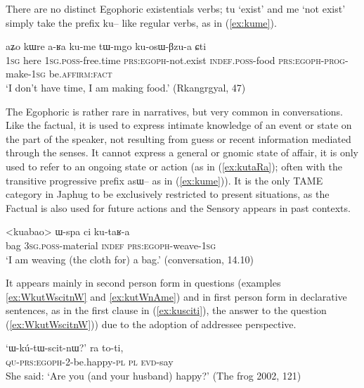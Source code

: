\documentclass[oldfontcommands,oneside,a4paper,11pt]{article}
\newcommand{\ipa}[1]{{\phon \mbox{#1}}} %
\newcommand{\refb}[1]{(\ref{#1})}
\newcommand{\factual}[1]{\textsc{:fact}}
\begin{document}
There are no distinct Egophoric existentials verbs; \ipa{tu} `exist' and \ipa{me}  `not exist' simply take the prefix \ipa{ku--} like regular verbs, as in \refb{ex:kume}.

\begin{exe}
\ex \label{ex:kume}
\gll 
\ipa{aʑo}  	\ipa{kɯre}  	\ipa{a-ʁa}  	\ipa{ku-me}  \ipa{tɯ-mgo} 	\ipa{ku-osɯ-βzu-a} 	\ipa{ɕti} 	  	\\
\textsc{1sg} here \textsc{1sg.poss}-free.time \textsc{prs:egoph}-not.exist \textsc{indef.poss}-food \textsc{prs:egoph}-\textsc{prog}-make-\textsc{1sg} be.\textsc{affirm}\factual{}  \\
\glt `I don't have time, I am making food.'  (Rkangrgyal, 47)
\end{exe}

The Egophoric  is rather rare in narratives, but very common in conversations. Like the factual, it is used to express intimate knowledge of an event or state on the part of the speaker, not resulting from guess or recent information mediated through the senses. It cannot express a general or gnomic state of affair, it is only used to refer to an ongoing state or action (as in \refb{ex:kutaRa}; often with the transitive progressive prefix \ipa{asɯ--} as in \refb{ex:kume}). It is the only TAME category in Japhug to be exclusively restricted to present situations, as the Factual is also used for future actions and the Sensory appears in past contexts.

\begin{exe}
\ex \label{ex:kutaRa}
\gll 
<kuabao> 	\ipa{ɯ-spa}  	\ipa{ci}  	\ipa{ku-taʁ-a}  \\
bag \textsc{3sg.poss}-material \textsc{indef} \textsc{prs:egoph}-weave-\textsc{1sg} \\
\glt `I am weaving (the cloth for) a bag.' (conversation, 14.10)
\end{exe}


It appears mainly  in second person form in questions (examples \ref{ex:WkutWscitnW} and \ref{ex:kutWnAme}) and in first person form in declarative sentences, as in the first clause in \refb{ex:kusciti}, the answer to the question \refb{ex:WkutWscitnW}) due to the adoption of addressee perspective.

\begin{exe}
\ex \label{ex:WkutWscitnW}
\gll	`\ipa{ɯ-kú-tɯ-scit-nɯ?}' 	\ipa{ra} 	\ipa{to-ti,} \\
  \textsc{qu-prs:egoph}-2-be.happy-\textsc{pl} \textsc{pl} \textsc{evd}-say \\
\glt She said: `Are you (and your husband) happy?' (The frog 2002, 121)
\end{exe}
\end{document}
